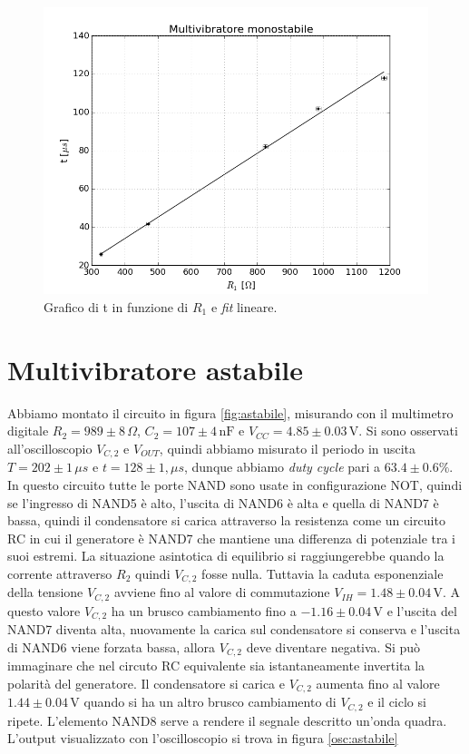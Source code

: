 \documentclass[10pt,a4paper]{article}
\begin{document}
\begin{figure}[!htb]
  \centering
  \includegraphics[scale=0.5]{fitmonostabile.png}
\caption{Grafico di t in funzione di $R_1$ e \emph{fit} lineare.\label{fit:monostabile}}
\end{figure}


\section{Multivibratore astabile}
Abbiamo montato il circuito in figura \ref{fig:astabile}, misurando con il multimetro digitale $R_2= 989\pm8\,\Omega$, $C_2= 107\pm4 \,\text{nF} $ e $V_{CC}= 4.85\pm0.03\,\text{V}$. Si sono osservati all'oscilloscopio $V_{C,2}$ e $V_{OUT}$, quindi abbiamo misurato il periodo in uscita $T= 202\pm1\,\mu s $ e $t= 128\pm1,\mu s $, dunque  abbiamo \emph{duty cycle} pari a $63.4\pm0.6\%$. In questo circuito tutte le porte NAND sono usate in configurazione NOT, quindi se l'ingresso di NAND5 è alto, l'uscita di NAND6 è alta e quella di NAND7 è bassa, quindi il condensatore si carica attraverso la resistenza come un circuito RC in cui il generatore è NAND7 che mantiene una differenza di potenziale tra i suoi estremi. La situazione asintotica di equilibrio si raggiungerebbe quando la corrente attraverso $R_2$ quindi $V_{C,2}$ fosse nulla. Tuttavia la caduta esponenziale della tensione $V_{C,2}$ avviene fino al valore di commutazione $V_{IH}=1.48\pm0.04\,\text{V}$. A questo valore $V_{C,2}$ ha un brusco cambiamento fino a $-1.16\pm0.04 \,\text{V}$ e l'uscita del NAND7 diventa alta, nuovamente la carica sul condensatore si conserva e l'uscita di NAND6 viene forzata bassa, allora $V_{C,2}$ deve diventare negativa. Si può immaginare che nel circuto RC equivalente sia istantaneamente invertita la polarità del generatore. Il condensatore si carica e $V_{C,2}$ aumenta fino al valore $1.44\pm0.04\,\text{V}$ quando si ha un altro brusco cambiamento di $V_{C,2}$ e il ciclo si ripete. L'elemento NAND8 serve a rendere il segnale descritto un'onda quadra. L'output visualizzato con l'oscilloscopio si trova in figura \ref{osc:astabile}
\end{document}
